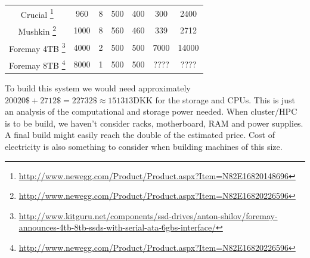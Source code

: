 \begin{table}[H]
\begin{tabular}{|ccccccc}
\multicolumn{1}{|c|}{Crucial \footnote{\url{http://www.newegg.com/Product/Product.aspx?Item=N82E16820148696}} }          & 960                          & 8                           & 500                       & 400                             & 300                        & 2400                                          \\
\multicolumn{1}{|c|}{Mushkin \footnote{\url{http://www.newegg.com/Product/Product.aspx?Item=N82E16820226596}}  } & 1000                         & 8                            & 560                       & 460                             & 339                        & 2712                                          \\
\multicolumn{1}{|c|}{Foremay 4TB \footnote{\url{http://www.kitguru.net/components/ssd-drives/anton-shilov/foremay-announces-4tb-8tb-ssds-with-serial-ata-6gbs-interface/}}  } & 4000                         & 2                            & 500                       & 500                            & 7000                        & 14000                                          \\
\multicolumn{1}{|c|}{Foremay 8TB \footnote{\url{http://www.newegg.com/Product/Product.aspx?Item=N82E16820226596}}  } & 8000                         & 1                            & 500                       & 500                             & ????                        &????                                          \\ \cline{1-1}

\end{tabular}
\end{table}
To build this system we would need approximately
$20020\$+2712\$=22732\$ \approx 151313 $DKK for the storage and
CPUs. This is just an analysis of the computational and storage power
needed. When cluster/HPC is to be build, we haven't consider racks,
motherboard, RAM and power supplies. A final build might easily reach
the double of the estimated price. Cost of electricity is also
something to consider when building machines of this size.


